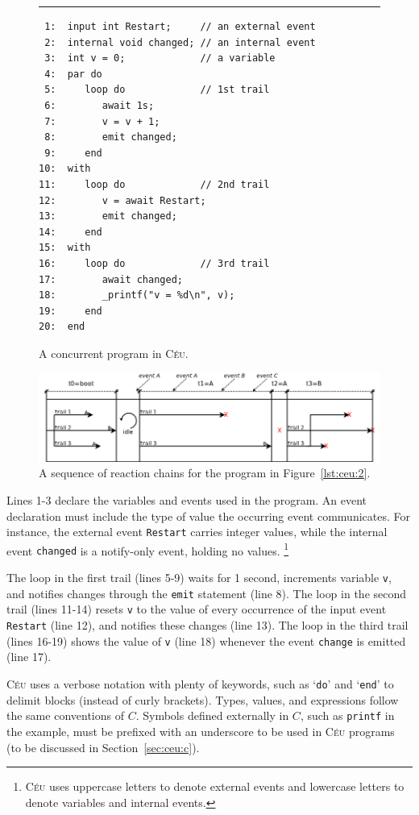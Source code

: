 \documentclass{sigplan-proc}
\newcommand{\2}{\;\;}
\newcommand{\5}{\;\;\;\;\;}
\newcommand{\CEU}{\textsc{C\'{e}u}}
\newcommand{\code}[1] {{\small{\texttt{#1}}}}
\begin{document}
\begin{figure}[t]
\rule{8.5cm}{0.37pt}
{\small
\begin{verbatim}
 1:  input int Restart;     // an external event
 2:  internal void changed; // an internal event
 3:  int v = 0;             // a variable
 4:  par do
 5:     loop do             // 1st trail
 6:        await 1s;
 7:        v = v + 1;
 8:        emit changed;
 9:     end
10:  with
11:     loop do             // 2nd trail
12:        v = await Restart;
13:        emit changed;
14:     end
15:  with
16:     loop do             // 3rd trail
17:        await changed;
18:        _printf("v = %d\n", v);
19:     end
20:  end
\end{verbatim}
}
\caption{ A concurrent program in \CEU{}.
\label{lst:ceu:1}
}
\end{figure}

\begin{figure}[t]
\centering
\includegraphics[scale=0.50]{reaction.png}
\caption{ A sequence of reaction chains for the program in 
Figure~\ref{lst:ceu:2}.
\label{fig:reaction}
}
\end{figure}

Lines 1-3 declare the variables and events used in the program.
An event declaration must include the type of value the occurring event 
communicates.
For instance, the external event \code{Restart} carries integer values, while 
the internal event \code{changed} is a notify-only event, holding no values.
\footnote{\CEU{} uses uppercase letters to denote external events and lowercase 
letters to denote variables and internal events.}

The loop in the first trail (lines 5-9) waits for 1 second, increments variable 
\code{v}, and notifies changes through the \code{emit} statement (line 8).
The loop in the second trail (lines 11-14) resets \code{v} to the value of 
every occurrence of the input event \code{Restart} (line 12), and notifies 
these changes (line 13).
The loop in the third trail (lines 16-19) shows the value of \code{v} (line 18) 
whenever the event \code{change} is emitted (line 17).

\CEU{} uses a verbose notation with plenty of keywords, such as `\code{do}' and 
`\code{end}' to delimit blocks (instead of curly brackets).
Types, values, and expressions follow the same conventions of $C$.
Symbols defined externally in $C$, such as \code{printf} in the example, must 
be prefixed with an underscore to be used in \CEU{} programs (to be discussed 
in Section~\ref{sec:ceu:c}).
\end{document}
